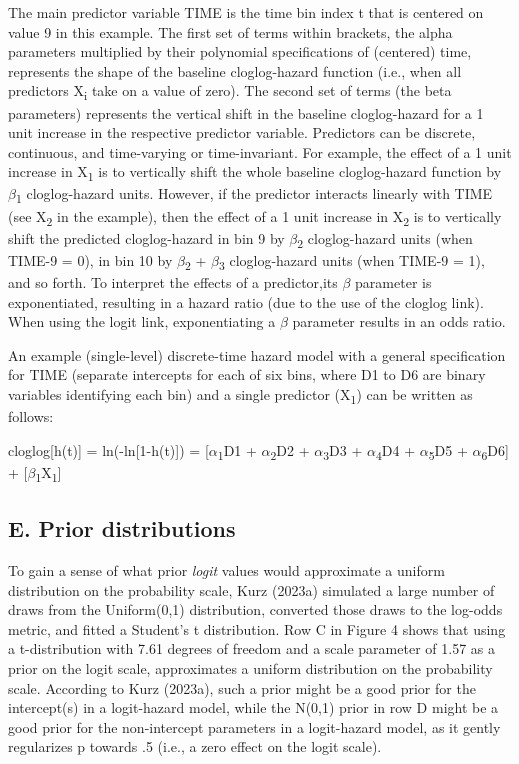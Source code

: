 \documentclass[
  man,floatsintext]{apa6}
\begin{document}
The main predictor variable TIME is the time bin index t that is centered on value 9 in this example. The first set of terms within brackets, the alpha parameters multiplied by their polynomial specifications of (centered) time, represents the shape of the baseline cloglog-hazard function (i.e., when all predictors X\textsubscript{i} take on a value of zero). The second set of terms (the beta parameters) represents the vertical shift in the baseline cloglog-hazard for a 1 unit increase in the respective predictor variable. Predictors can be discrete, continuous, and time-varying or time-invariant. For example, the effect of a 1 unit increase in X\textsubscript{1} is to vertically shift the whole baseline cloglog-hazard function by \(\beta\)\textsubscript{1} cloglog-hazard units. However, if the predictor interacts linearly with TIME (see X\textsubscript{2} in the example), then the effect of a 1 unit increase in X\textsubscript{2} is to vertically shift the predicted cloglog-hazard in bin 9 by \(\beta\)\textsubscript{2} cloglog-hazard units (when TIME-9 = 0), in bin 10 by \(\beta\)\textsubscript{2} + \(\beta\)\textsubscript{3} cloglog-hazard units (when TIME-9 = 1), and so forth. To interpret the effects of a predictor,its \(\beta\) parameter is exponentiated, resulting in a hazard ratio (due to the use of the cloglog link). When using the logit link, exponentiating a \(\beta\) parameter results in an odds ratio.

An example (single-level) discrete-time hazard model with a general specification for TIME (separate intercepts for each of six bins, where D1 to D6 are binary variables identifying each bin) and a single predictor (X\textsubscript{1}) can be written as follows:

cloglog{[}h(t){]} = ln(-ln{[}1-h(t){]}) = {[}\(\alpha\)\textsubscript{1}D1 + \(\alpha\)\textsubscript{2}D2 + \(\alpha\)\textsubscript{3}D3 + \(\alpha\)\textsubscript{4}D4 + \(\alpha\)\textsubscript{5}D5 + \(\alpha\)\textsubscript{6}D6{]} + {[}\(\beta\)\textsubscript{1}X\textsubscript{1}{]}

\subsection{E. Prior distributions}\label{e.-prior-distributions}

To gain a sense of what prior \emph{logit} values would approximate a uniform distribution on the probability scale, Kurz (2023a) simulated a large number of draws from the Uniform(0,1) distribution, converted those draws to the log-odds metric, and fitted a Student's t distribution. Row C in Figure 4 shows that using a t-distribution with 7.61 degrees of freedom and a scale parameter of 1.57 as a prior on the logit scale, approximates a uniform distribution on the probability scale. According to Kurz (2023a), such a prior might be a good prior for the intercept(s) in a logit-hazard model, while the N(0,1) prior in row D might be a good prior for the non-intercept parameters in a logit-hazard model, as it gently regularizes p towards .5 (i.e., a zero effect on the logit scale).
\end{document}
